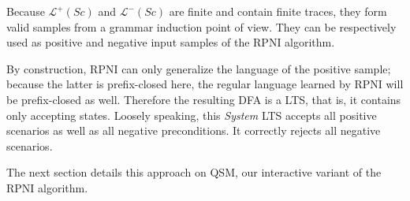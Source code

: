 Because $\mathcal{L}^+(Sc)$ and $\mathcal{L}^-(Sc)$ are finite and contain finite traces, they form valid samples from a grammar induction point of view. They can be respectively used as positive and negative input samples of the RPNI algorithm. 

By construction, RPNI can only generalize the language of the positive sample; because the latter is prefix-closed here, the regular language learned by RPNI will be prefix-closed as well. Therefore the resulting DFA is a LTS, that is, it contains only accepting states. Loosely speaking, this \emph{System} LTS accepts all positive scenarios as well as all negative preconditions. It correctly rejects all negative scenarios. 

The next section details this approach on QSM, our interactive variant of the RPNI algorithm. 
